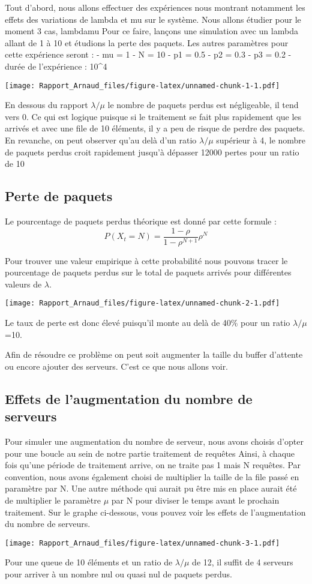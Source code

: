 \documentclass[]{article}
\begin{document}
Tout d'abord, nous allons effectuer des expériences nous montrant
notamment les effets des variations de lambda et mu sur le système. Nous
allons étudier pour le moment 3 cas, lambdamu Pour ce faire, lançons une
simulation avec un lambda allant de 1 à 10 et étudions la perte des
paquets. Les autres paramètres pour cette expérience seront : - mu = 1 -
N = 10 - p1 = 0.5 - p2 = 0.3 - p3 = 0.2 - durée de l'expérience :
10\^{}4

\texttt{[image: Rapport\_Arnaud\_files/figure-latex/unnamed-chunk-1-1.pdf]}

En dessous du rapport \(\lambda/\mu\) le nombre de paquets perdus est
négligeable, il tend vers 0. Ce qui est logique puisque si le traitement
se fait plus rapidement que les arrivés et avec une file de 10 éléments,
il y a peu de risque de perdre des paquets. En revanche, on peut
observer qu'au delà d'un ratio \(\lambda/\mu\) supérieur à 4, le nombre
de paquets perdus croit rapidement jusqu'à dépasser 12000 pertes pour un
ratio de 10

\subsection{Perte de paquets}\label{perte-de-paquets}

Le pourcentage de paquets perdus théorique est donné par cette formule :
\[P(X_t=N)=\frac{1-\rho}{1-\rho^{N+1}}\rho^N\]

Pour trouver une valeur empirique à cette probabilité nous pouvons
tracer le pourcentage de paquets perdus sur le total de paquets arrivés
pour différentes valeurs de \(\lambda\).

\texttt{[image: Rapport\_Arnaud\_files/figure-latex/unnamed-chunk-2-1.pdf]}

Le taux de perte est donc élevé puisqu'il monte au delà de 40\% pour un
ratio \(\lambda/\mu\)=10.

Afin de résoudre ce problème on peut soit augmenter la taille du buffer
d'attente ou encore ajouter des serveurs. C'est ce que nous allons voir.

\subsection{Effets de l'augmentation du nombre de
serveurs}\label{effets-de-laugmentation-du-nombre-de-serveurs}

Pour simuler une augmentation du nombre de serveur, nous avons choisis
d'opter pour une boucle au sein de notre partie traitement de requêtes
Ainsi, à chaque fois qu'une période de traitement arrive, on ne traite
pas 1 mais N requêtes. Par convention, nous avons également choisi de
multiplier la taille de la file passé en paramètre par N. Une autre
méthode qui aurait pu être mis en place aurait été de multiplier le
paramètre \(\mu\) par N pour diviser le temps avant le prochain
traitement. Sur le graphe ci-dessous, vous pouvez voir les effets de
l'augmentation du nombre de serveurs.

\texttt{[image: Rapport\_Arnaud\_files/figure-latex/unnamed-chunk-3-1.pdf]}

Pour une queue de 10 éléments et un ratio de \(\lambda/\mu\) de 12, il
suffit de 4 serveurs pour arriver à un nombre nul ou quasi nul de
paquets perdus.
\end{document}
